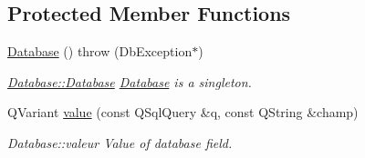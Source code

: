 \subsection*{Protected Member Functions}
\begin{DoxyCompactItemize}
\item 
\hypertarget{classDatabases_1_1Database_a7d14f43864ce19a5e399ea4ed3ce808f}{\hyperlink{classDatabases_1_1Database_a7d14f43864ce19a5e399ea4ed3ce808f}{Database} ()  throw (\-Db\-Exception$\ast$)}\label{classDatabases_1_1Database_a7d14f43864ce19a5e399ea4ed3ce808f}

\begin{DoxyCompactList}\small\item\em \hyperlink{classDatabases_1_1Database_a7d14f43864ce19a5e399ea4ed3ce808f}{Database\-::\-Database} \hyperlink{classDatabases_1_1Database}{Database} is a singleton. \end{DoxyCompactList}\item 
Q\-Variant \hyperlink{classDatabases_1_1Database_a5d8a99bd2d7b5c77eacb942ed790b12c}{value} (const Q\-Sql\-Query \&q, const Q\-String \&champ)
\begin{DoxyCompactList}\small\item\em Database\-::valeur Value of database field. \end{DoxyCompactList}\end{DoxyCompactItemize}
